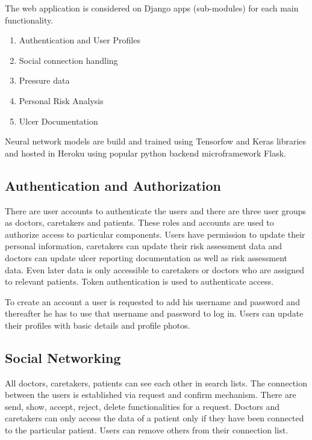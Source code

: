 The web application is considered on Django apps (sub-modules) for each main functionality.
\begin{enumerate}
	\item Authentication and User Profiles
	\item Social connection handling
	\item Pressure data
	\item Personal Risk Analysis
	\item Ulcer Documentation
\end{enumerate}

Neural network models are build and trained using Tensorfow\textsuperscript{\textregistered} and Keras\textsuperscript{\textregistered} libraries and hosted in Heroku\textsuperscript{\textregistered} using popular python backend microframework Flask\textsuperscript{\textregistered}.


\subsection{Authentication and Authorization}

There are user accounts to authenticate the users and there are three user groups as doctors, caretakers and patients. These roles and accounts are used to authorize access to particular components. Users have permission to update their personal information, caretakers can update their risk assessment data and doctors can update ulcer reporting documentation as well as risk assessment data. Even later data is only accessible to caretakers or doctors who are assigned to relevant patients. Token authentication is used to authenticate access.

To create an account a user is requested to add his username and password and thereafter he has to use that username and password to log in. Users can update their profiles with basic details and profile photos.

\subsection{Social Networking}

All doctors, caretakers, patients can see each other in search lists. The connection between the users is established via request and confirm mechanism. There are send, show, accept, reject, delete functionalities for a request. Doctors and caretakers can only access the data of a patient only if they have been connected to the particular patient. Users can remove others from their connection list. 

